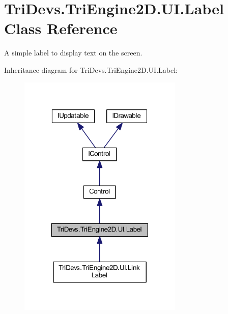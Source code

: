 \hypertarget{class_tri_devs_1_1_tri_engine2_d_1_1_u_i_1_1_label}{\section{Tri\-Devs.\-Tri\-Engine2\-D.\-U\-I.\-Label Class Reference}
\label{class_tri_devs_1_1_tri_engine2_d_1_1_u_i_1_1_label}
}


A simple label to display text on the screen.  




Inheritance diagram for Tri\-Devs.\-Tri\-Engine2\-D.\-U\-I.\-Label\-:
\nopagebreak
\begin{figure}[H]
\begin{center}
\leavevmode
\includegraphics[width=222pt]{class_tri_devs_1_1_tri_engine2_d_1_1_u_i_1_1_label__inherit__graph}
\end{center}
\end{figure}


